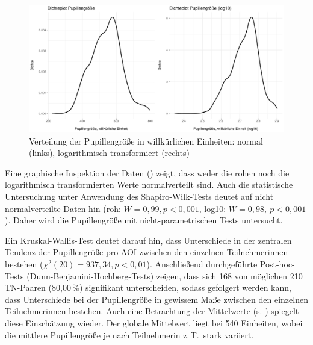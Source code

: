 


\begin{figure}
	\includegraphics[width=\textwidth]{Figures/EyeTracking/CatDe/ggplot_catde-PSize_density_de}
	\caption{Verteilung der Pupillengröße in willkürlichen Einheiten: normal (links), logarithmisch transformiert (rechts)}
	\label{K6:fig:CatDe:density-PSize}
\end{figure}


Eine graphische Inspektion der Daten () zeigt, dass weder die rohen noch die logarithmisch transformierten Werte normalverteilt sind. Auch die statistische Untersuchung unter Anwendung des Shapiro-Wilk-Tests deutet auf nicht normalverteilte Daten hin (roh: $W = 0,99, p < 0,001$, log10: $W = 0,98,\allowbreak\ p < 0,001$). Daher wird die Pupillengröße mit nicht-parametrischen Tests untersucht.

Ein Kruskal-Wallis-Test deutet darauf hin, dass Unterschiede in der zentralen Tendenz der Pupillengröße pro AOI zwischen den einzelnen Teilnehmer{\textperiodcentered}innen bestehen ($\chi^2(20) = 937,34, p < 0,01$). Anschließend durchgeführte Post-hoc-Tests (Dunn-Benjamini-Hochberg-Tests) zeigen, dass sich 168 von möglichen 210 TN-Paaren (80,00\,\%) signifikant unterscheiden, sodass gefolgert werden kann, dass Unterschiede bei der Pupillengröße in gewissem Maße zwischen den einzelnen Teilnehmer{\textperiodcentered}innen bestehen. Auch eine Betrachtung der Mittelwerte (s. ) spiegelt diese Einschätzung wieder. Der globale Mittelwert liegt bei 540 Einheiten, wobei die mittlere Pupillengröße je nach Teilnehmer{\textperiodcentered}in z.\,T.\ stark variiert.

